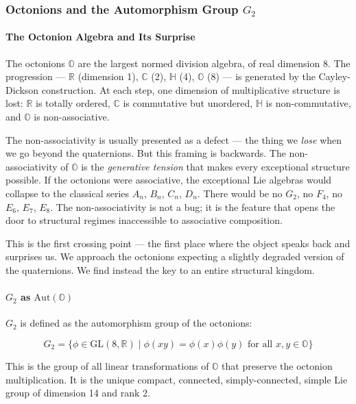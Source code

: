 \documentclass[12pt,a4paper]{article}
\begin{document}
\subsubsection{Octonions and the Automorphism Group $G_2$}

\paragraph{The Octonion Algebra and Its Surprise}

The octonions $\mathbb{O}$ are the largest normed division algebra, of real dimension 8. The progression --- $\mathbb{R}$ (dimension 1), $\mathbb{C}$ (2), $\mathbb{H}$ (4), $\mathbb{O}$ (8) --- is generated by the Cayley-Dickson construction. At each step, one dimension of multiplicative structure is lost: $\mathbb{R}$ is totally ordered, $\mathbb{C}$ is commutative but unordered, $\mathbb{H}$ is non-commutative, and $\mathbb{O}$ is non-associative.

The non-associativity is usually presented as a defect --- the thing we \emph{lose} when we go beyond the quaternions. But this framing is backwards. The non-associativity of $\mathbb{O}$ is the \emph{generative tension} that makes every exceptional structure possible. If the octonions were associative, the exceptional Lie algebras would collapse to the classical series $A_n$, $B_n$, $C_n$, $D_n$. There would be no $G_2$, no $F_4$, no $E_6$, $E_7$, $E_8$. The non-associativity is not a bug; it is the feature that opens the door to structural regimes inaccessible to associative composition.

This is the first crossing point --- the first place where the object speaks back and surprises us. We approach the octonions expecting a slightly degraded version of the quaternions. We find instead the key to an entire structural kingdom.

\paragraph{$G_2$ as $\text{Aut}(\mathbb{O})$}

$G_2$ is defined as the automorphism group of the octonions:

\[G_2 = \{ \phi \in \text{GL}(8,\mathbb{R}) \mid \phi(xy) = \phi(x)\phi(y) \text{ for all } x,y \in \mathbb{O} \}\]

This is the group of all linear transformations of $\mathbb{O}$ that preserve the octonion multiplication. It is the unique compact, connected, simply-connected, simple Lie group of dimension 14 and rank 2.
\end{document}
